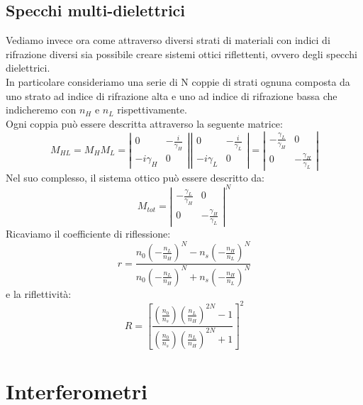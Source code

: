 \documentclass{article}
\begin{document}
\subsection{Specchi multi-dielettrici}
Vediamo invece ora come attraverso diversi strati di materiali con indici di rifrazione diversi sia possibile creare sistemi ottici riflettenti, ovvero degli specchi dielettrici.\\
In particolare consideriamo una serie di N coppie di strati ognuna composta da uno strato ad indice di rifrazione alta e uno ad indice di rifrazione bassa che indicheremo con $n_H$ e $n_L$ rispettivamente.\\
Ogni coppia può essere descritta attraverso la seguente matrice:
\begin{equation*}
M_{HL} = M_H M_L = \left| \begin{array}{cc}
0 & -\frac{i}{\gamma_H} \\
-i\gamma_H & 0
\end{array} \right|
\left| \begin{array}{cc}
0 & -\frac{i}{\gamma_L} \\
-i\gamma_L & 0
\end{array} \right|
= \left| \begin{array}{cc}
-\frac{\gamma_L}{\gamma_H} & 0\\
0 & -\frac{\gamma_H}{\gamma_L}
\end{array} \right|
\end{equation*}
Nel suo complesso, il sistema ottico può essere descritto da:
\begin{equation}
M_{tot} = \left| \begin{array}{cc}
-\frac{\gamma_L}{\gamma_H} & 0\\
0 & -\frac{\gamma_H}{\gamma_L}
\end{array} \right|^N
\end{equation}
Ricaviamo il coefficiente di riflessione:
\begin{equation*}
r = \frac{n_0(-\frac{n_L}{n_H})^N - n_s(-\frac{n_H}{n_L})^N}{n_0(-\frac{n_L}{n_H})^N + n_s(-\frac{n_H}{n_L})^N}
\end{equation*}
e la riflettività:
\begin{equation*}
R = \left[\frac{(\frac{n_0}{n_s})(\frac{n_L}{n_H})^{2N} - 1}{(\frac{n_0}{n_s})(\frac{n_L}{n_H})^{2N} + 1}\right]^2
\end{equation*}

\section{Interferometri}
\end{document}
